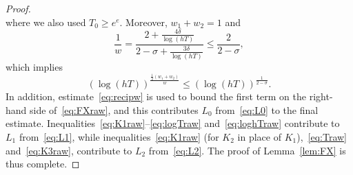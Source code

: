 \documentclass[a4paper,reqno]{amsart}
\theoremstyle{definition}
\begin{document}
\begin{proof}
\begin{equation}
\end{equation}
where we also used $T_0\geq e^{e}$. Moreover, $w_1+w_2=1$ and
\begin{equation}
\label{eq:recipw}  
\frac{1}{w} = \frac{2+\frac{4\delta}{\log{(hT)}}}{2-\sigma+\frac{3\delta}{\log{(hT)}}} \leq \frac{2}{2-\sigma},
\end{equation}
which implies
\begin{equation}
\label{eq:loghTraw}
\left(\log{(hT)}\right)^{\frac{\frac{1}{2}\left(w_1+w_2\right)}{w}} \leq \left(\log{(hT)}\right)^{\frac{1}{2-\sigma}}.
\end{equation}
In addition, estimate~\eqref{eq:recipw} is used to bound the first term on the right-hand side of~\eqref{eq:FXraw}, and this contributes $L_0$ from~\eqref{eq:L0} to the final estimate. Inequalities~\eqref{eq:K1raw}--\eqref{eq:logTraw} and~\eqref{eq:loghTraw} contribute to $L_1$ from~\eqref{eq:L1}, while inequalities~\eqref{eq:K1raw} (for $K_2$ in place of $K_1$),~\eqref{eq:Traw} and~\eqref{eq:K3raw}, contribute to $L_2$ from~\eqref{eq:L2}. The proof of Lemma~\ref{lem:FX} is thus complete.
\end{proof}
\end{document}
